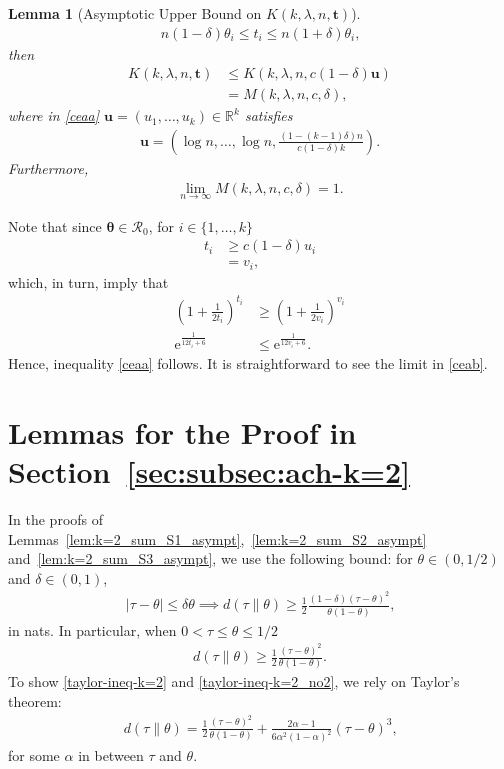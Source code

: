\documentclass[journal, 10pt]{IEEEtran}
\newcommand{\bbR}{\mathbb{R}}
\newcommand{\rme}{\mathrm{e}}
\newcommand{\cR}{\mathcal{R}}
\theoremstyle{plain}
\theoremstyle{plain}
\newtheorem{lem}{Lemma}%
\theoremstyle{plain}
\theoremstyle{plain}
\newcommand{\boldtheta}{\mathbold{\theta}}
\newcommand{\boldt}{\mathbold{t}}
\begin{document}
\begin{appendices}
\begin{lem}[Asymptotic Upper Bound on $K(k, \lambda, n, \boldt )$]
\begin{align}
 n(1-\delta)\theta_i  \le t_i \le  n(1+\delta)\theta_i  \text{,}
\end{align}
then
\begin{align}
K(k, \lambda, n, \boldt ) &\le  K(k,\lambda, n, c(1-\delta)\mathbold{u} ) \label{ceaa} \\
&=M(k, \lambda, n, c, \delta)\text{,}
\end{align}
where in \eqref{ceaa} $\mathbold{u} = (u_1, \ldots, u_k) \in \bbR^k $ satisfies
\begin{align}
\mathbold{u} = \left(\log n  , \hdots, \log n, \frac{(1-(k-1)\delta)n}{c(1-\delta)k}\right)	\text{.}
\end{align}
Furthermore,
\begin{align}
\lim_{n\to \infty} M(k, \lambda, n, c, \delta) = 1\text{.} 
\label{ceab}
\end{align}
\end{lem}
\begin{IEEEproof}
Note that since $\boldtheta\in \cR_0$, for $i\in \{1,\hdots, k \}$
\begin{align}
t_i &\ge c(1-\delta) u_i \\
&= v_i \text{,} 
\end{align}
which, in turn, imply that 
\begin{align}
\left( 1+\frac{1}{2t_i} \right)^{t_i} &\ge \left(1+\frac{1}{2{v_i}} \right)^{{v_i}}  \label{apph:func1} \\
\rme^{\frac{1}{12t_i+6}}   &\le  \rme^{\frac{1}{12{v_i}+6}}  \text{.}
\end{align}
Hence, inequality \eqref{ceaa} follows. It is straightforward to see the limit in \eqref{ceab}.
\end{IEEEproof}
\section{Lemmas for the Proof in Section~\ref{sec:subsec:ach-k=2}} \label{appdx:achievebility_k=2}
In the proofs of Lemmas~\ref{lem:k=2_sum_S1_asympt},~\ref{lem:k=2_sum_S2_asympt} and~\ref{lem:k=2_sum_S3_asympt}, we use the following bound: for $\theta \in (0, 1/2)$ and $\delta\in (0,1)$,
\begin{align}
|\tau-\theta|\le \delta \theta \implies d(\tau\| \theta)\ge \frac{1}{2} \frac{(1-\delta)(\tau-\theta)^2}{\theta(1-\theta)}\text{,} \label{taylor-ineq-k=2}
\end{align}
in nats. In particular, when $0< \tau \le \theta \le 1/2 $
\begin{align}
	d(\tau\|\theta)\ge \frac{1}{2} \frac{(\tau-\theta)^2}{\theta(1-\theta)}\text{.} \label{taylor-ineq-k=2_no2}
\end{align}
To show \eqref{taylor-ineq-k=2} and \eqref{taylor-ineq-k=2_no2}, we rely on Taylor's theorem:
\begin{align}
d(\tau\| \theta)=\frac{1}{2}\frac{(\tau-\theta)^2}{\theta(1-\theta)}+\frac{2\alpha-1}{6\alpha^2(1-\alpha)^2}(\tau-\theta)^3\text{,} \label{taylor-eq-k=2}
\end{align}
for some $\alpha$ in between $\tau$ and $\theta$. 


\end{appendices}
\end{document}

